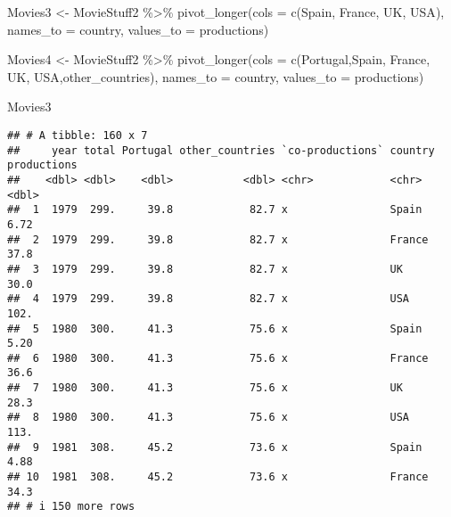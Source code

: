 \documentclass[
]{article}
\newenvironment{Shaded}{\begin{snugshade}}{\end{snugshade}}
\newcommand{\AttributeTok}[1]{\textcolor[rgb]{0.77,0.63,0.00}{#1}}
\newcommand{\FunctionTok}[1]{\textcolor[rgb]{0.00,0.00,0.00}{#1}}
\newcommand{\NormalTok}[1]{#1}
\newcommand{\OtherTok}[1]{\textcolor[rgb]{0.56,0.35,0.01}{#1}}
\newcommand{\SpecialCharTok}[1]{\textcolor[rgb]{0.00,0.00,0.00}{#1}}
\newcommand{\StringTok}[1]{\textcolor[rgb]{0.31,0.60,0.02}{#1}}
\begin{document}
\begin{Shaded}
\begin{Highlighting}[]
\NormalTok{Movies3 }\OtherTok{\textless{}{-}}\NormalTok{ MovieStuff2 }\SpecialCharTok{\%\textgreater{}\%} \FunctionTok{pivot\_longer}\NormalTok{(}\AttributeTok{cols =} \FunctionTok{c}\NormalTok{(}\StringTok{\textquotesingle{}Spain\textquotesingle{}}\NormalTok{, }\StringTok{\textquotesingle{}France\textquotesingle{}}\NormalTok{, }\StringTok{\textquotesingle{}UK\textquotesingle{}}\NormalTok{, }\StringTok{\textquotesingle{}USA\textquotesingle{}}\NormalTok{),}
    \AttributeTok{names\_to =} \StringTok{\textquotesingle{}country\textquotesingle{}}\NormalTok{,}
    \AttributeTok{values\_to =} \StringTok{\textquotesingle{}productions\textquotesingle{}}\NormalTok{)}


\NormalTok{Movies4 }\OtherTok{\textless{}{-}}\NormalTok{ MovieStuff2 }\SpecialCharTok{\%\textgreater{}\%} \FunctionTok{pivot\_longer}\NormalTok{(}\AttributeTok{cols =} \FunctionTok{c}\NormalTok{(}\StringTok{\textquotesingle{}Portugal\textquotesingle{}}\NormalTok{,}\StringTok{\textquotesingle{}Spain\textquotesingle{}}\NormalTok{, }\StringTok{\textquotesingle{}France\textquotesingle{}}\NormalTok{, }\StringTok{\textquotesingle{}UK\textquotesingle{}}\NormalTok{, }\StringTok{\textquotesingle{}USA\textquotesingle{}}\NormalTok{,}\StringTok{\textquotesingle{}other\_countries\textquotesingle{}}\NormalTok{),}
    \AttributeTok{names\_to =} \StringTok{\textquotesingle{}country\textquotesingle{}}\NormalTok{,}
    \AttributeTok{values\_to =} \StringTok{\textquotesingle{}productions\textquotesingle{}}\NormalTok{)}
\end{Highlighting}
\end{Shaded}

\begin{Shaded}
\begin{Highlighting}[]
\NormalTok{Movies3}
\end{Highlighting}
\end{Shaded}

\begin{verbatim}
## # A tibble: 160 x 7
##     year total Portugal other_countries `co-productions` country productions
##    <dbl> <dbl>    <dbl>           <dbl> <chr>            <chr>         <dbl>
##  1  1979  299.     39.8            82.7 x                Spain          6.72
##  2  1979  299.     39.8            82.7 x                France        37.8 
##  3  1979  299.     39.8            82.7 x                UK            30.0 
##  4  1979  299.     39.8            82.7 x                USA          102.  
##  5  1980  300.     41.3            75.6 x                Spain          5.20
##  6  1980  300.     41.3            75.6 x                France        36.6 
##  7  1980  300.     41.3            75.6 x                UK            28.3 
##  8  1980  300.     41.3            75.6 x                USA          113.  
##  9  1981  308.     45.2            73.6 x                Spain          4.88
## 10  1981  308.     45.2            73.6 x                France        34.3 
## # i 150 more rows
\end{verbatim}
\end{document}
